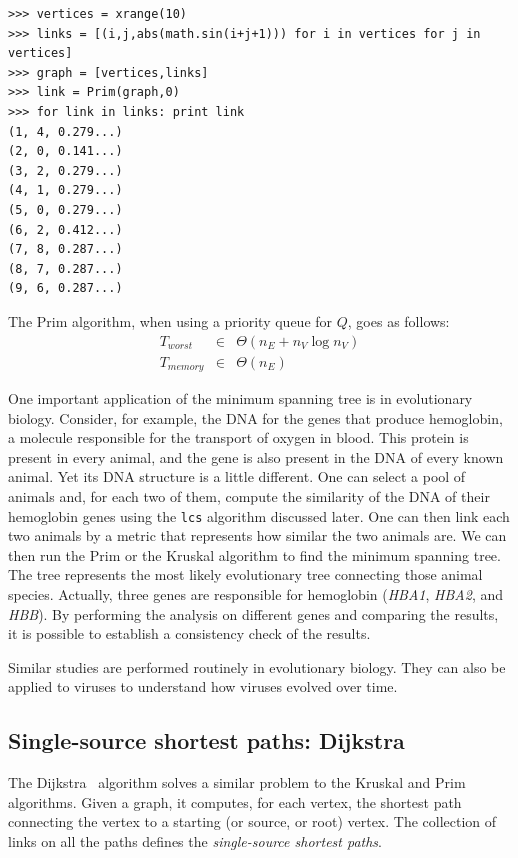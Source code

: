 \documentclass[justified,sixbynine]{tufte-book}
\def\ft{\small\tt}
\theoremstyle{plain}%
\theoremstyle{definition}
\theoremstyle{remark}
\begin{document}
\begin{fullwidth}
\begin{lstlisting}
>>> vertices = xrange(10)
>>> links = [(i,j,abs(math.sin(i+j+1))) for i in vertices for j in vertices]
>>> graph = [vertices,links]
>>> link = Prim(graph,0)
>>> for link in links: print link
(1, 4, 0.279...)
(2, 0, 0.141...)
(3, 2, 0.279...)
(4, 1, 0.279...)
(5, 0, 0.279...)
(6, 2, 0.412...)
(7, 8, 0.287...)
(8, 7, 0.287...)
(9, 6, 0.287...)
\end{lstlisting}

The Prim algorithm, when using a priority queue for $Q$, goes as follows:
\begin{eqnarray}
T_{worst} &\in &\Theta (n_E+n_V\log n_V) \\
T_{memory} &\in &\Theta (n_E)
\end{eqnarray}

One important application of the minimum spanning tree is in evolutionary biology. Consider, for example, the DNA for the genes that produce hemoglobin, a molecule responsible for the transport of oxygen in blood. This protein is present in every animal, and the gene is also present in the DNA of every known animal. Yet its DNA structure is a little different. One can select a pool of animals and, for each two of them, compute the similarity of the DNA of their hemoglobin genes using the {\ft lcs} algorithm discussed later. One can then link each two animals by a metric that represents how similar the two animals are. We can then run the Prim or the Kruskal algorithm to find the minimum spanning tree. The tree represents the most likely evolutionary tree connecting those animal species. Actually, three genes are responsible for hemoglobin ({\it HBA1}, {\it HBA2}, and {\it HBB}). By performing the analysis on different genes and comparing the results, it is possible to establish a consistency check of the results.~\cite{evolutionary}

Similar studies are performed routinely in evolutionary biology. They can also be applied to viruses to understand how viruses evolved over time.~\cite{korber}

\subsection{Single-source shortest paths: Dijkstra}


The Dijkstra~\cite{dijkstra} algorithm solves a similar problem to the Kruskal and Prim algorithms. Given a graph, it computes, for each vertex, the shortest path connecting the vertex to a starting (or source, or root) vertex. The collection of links on all the paths defines the {\it single-source shortest paths}.


\end{fullwidth}
\end{document}
